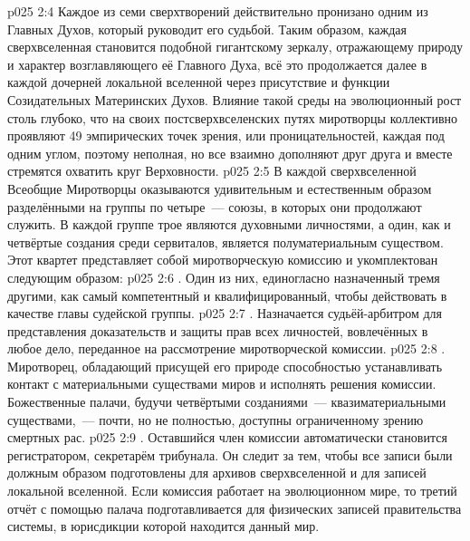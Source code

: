 \vs p025 2:4 Каждое из семи сверхтворений действительно пронизано одним из Главных Духов, который руководит его судьбой. Таким образом, каждая сверхвселенная становится подобной гигантскому зеркалу, отражающему природу и характер возглавляющего её Главного Духа, всё это продолжается далее в каждой дочерней локальной вселенной через присутствие и функции Созидательных Материнских Духов. Влияние такой среды на эволюционный рост столь глубоко, что на своих постсверхвселенских путях миротворцы коллективно проявляют 49 эмпирических точек зрения, или проницательностей, каждая под одним углом, поэтому неполная, но все взаимно дополняют друг друга и вместе стремятся охватить круг Верховности.
\vs p025 2:5 \pc В каждой сверхвселенной Всеобщие Миротворцы оказываются удивительным и естественным образом разделёнными на группы по четыре~--- союзы, в которых они продолжают служить. В каждой группе трое являются духовными личностями, а один, как и четвёртые создания среди сервиталов, является полуматериальным существом. Этот квартет представляет собой миротворческую комиссию и укомплектован следующим образом:
\vs p025 2:6 . Один из них, единогласно назначенный тремя другими, как самый компетентный и квалифицированный, чтобы действовать в качестве главы судейской группы.
\vs p025 2:7 . Назначается судьёй\hyp{}арбитром для представления доказательств и защиты прав всех личностей, вовлечённых в любое дело, переданное на рассмотрение миротворческой комиссии.
\vs p025 2:8 . Миротворец, обладающий присущей его природе способностью устанавливать контакт с материальными существами миров и исполнять решения комиссии. Божественные палачи, будучи четвёртыми созданиями~--- квазиматериальными существами,~--- почти, но не полностью, доступны ограниченному зрению смертных рас.
\vs p025 2:9 . Оставшийся член комиссии автоматически становится регистратором, секретарём трибунала. Он следит за тем, чтобы все записи были должным образом подготовлены для архивов сверхвселенной и для записей локальной вселенной. Если комиссия работает на эволюционном мире, то третий отчёт с помощью палача подготавливается для физических записей правительства системы, в юрисдикции которой находится данный мир.
